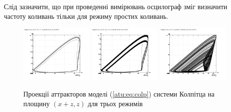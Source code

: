 Слід зазначити, що при проведенні вимірювань осцилограф зміг
визначити частоту коливань тільки для режиму простих коливань.


\begin{figure}[htb!]
 \centerline{
   \includegraphics[width=0.32\textwidth]{p/mod/colp_0-p_z_xpz_b=1x70.png}
   \includegraphics[width=0.32\textwidth]{p/mod/colp_0-p_z_xpz_b=1x37.png}
   \includegraphics[width=0.32\textwidth]{p/mod/colp_0-p_z_xpz_b=0x99.png}
 }
\caption{Проекції аттракторов моделі (\ref{atu:eq:colp}) системи Колпітца на площину $ (x + z, z) $ для трьох режимів}
\label{atu:f:colp_model_xzz}
\end{figure}



